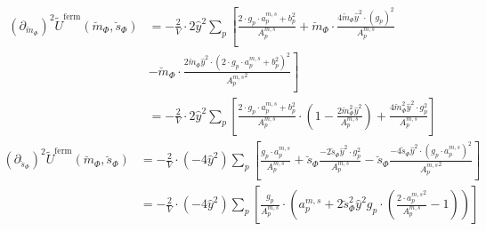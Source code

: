% 
\begin{align}\label{eq:CEP_derivative_dmdm_fermionicContribution_rescaled}        
 \left(\partial_{\breve m_{\Phi}} \right)^2 \tilde U^{\text{ferm}}(\breve m_{\Phi}, \breve s_{\Phi}) & = 
                                  - \frac{2}{V} \cdot 2 \hat y^2 \sum\limits_p \left[ \frac{2 \cdot g_p \cdot {a_p^{m,s}} + b_p^2}{ {A_p^{m, s}} } 
                                  + \breve m_{\Phi} \cdot \frac{   4 \breve m_{\Phi} \hat y^2 \cdot  \left(g_p\right)^2    }{{A_p^{m, s}} } \right.
       \nonumber \\
                                & - \left. \breve m_{\Phi} \cdot \frac{ 2 \breve m_{\Phi} \hat y^2 \cdot \left(2 \cdot g_p \cdot {a_p^{m,s}} + b_p^2 \right)^2 }
                                    { {A_p^{m, s}}^2 } \right]
       \nonumber \\
                                & = - \frac{2}{V} \cdot 2 \hat y^2 \sum\limits_p \left[ \frac{  2 \cdot g_p \cdot {a_p^{m,s}} + b_p^2   }{ {A_p^{m, s}} } 
                                    \cdot \left( 1 - \frac{2\breve m_{\Phi}^2 \hat y ^2}{ {A_p^{m, s}} }  \right) 
                                  + \frac{   4 \breve m_{\Phi}^2 \hat y ^2 \cdot g_p^2    }{{A_p^{m, s}} }\right]
\end{align} 
% 
\begin{align} \label{eq:CEP_derivative_dsds_fermionicContribution_rescaled}
 \left(\partial_{\breve s_{\Phi}} \right)^2 \tilde U^{\text{ferm}}(\breve m_{\Phi}, \breve s_{\Phi}) & = 
                                   - \frac{2}{V} \cdot (-4 \hat y^2) \sum\limits_p \left[ \frac{g_p \cdot {a_p^{m,s}} }{ {A_p^{m, s}} } 
                                  + \breve s_{\Phi} \frac{ -2 \breve s_{\Phi} \hat y^2 \cdot g_p^2}{ {A_p^{m, s}} }
                                  - \breve s_{\Phi} \frac{ -4 \breve s_{\Phi} \hat y^2 \cdot \left( g_p \cdot {a_p^{m,s}} \right)^2 }{ {A_p^{m, s}}^2 } \right]
      \nonumber \\
                                & = -\frac{2}{V} \cdot (-4 \hat y^2) \sum\limits_p \left[ \frac{g_p}{ {A_p^{m, s}} }\cdot \left( {a_p^{m,s}} 
                                    + 2 \breve s_{\Phi}^2 \hat y ^2 g_p  \cdot \left( \frac{ 2 \cdot {a_p^{m,s}}^2}{  {A_p^{m, s}} } - 1 \right) \right) \right]
\end{align}
% 
